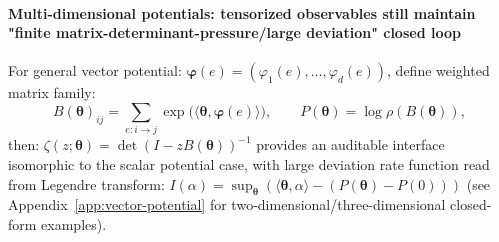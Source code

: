 \paragraph{Multi-dimensional potentials: tensorized observables still maintain "finite matrix-determinant-pressure/large deviation" closed loop}
For general vector potential:
\(
\boldsymbol{\varphi}(e)=(\varphi_1(e),\dots,\varphi_d(e))
\),
define weighted matrix family:
\[
B(\boldsymbol{\theta})_{ij}=\sum_{e:i\to j}\exp\!\bigl(\langle\boldsymbol{\theta},\boldsymbol{\varphi}(e)\rangle\bigr),
\qquad
P(\boldsymbol{\theta})=\log\rho(B(\boldsymbol{\theta})),
\]
then:
\(
\zeta(z;\boldsymbol{\theta})=\det(I-zB(\boldsymbol{\theta}))^{-1}
\)
provides an auditable interface isomorphic to the scalar potential case, with large deviation rate function read from Legendre transform:
\(
I(\alpha)=\sup_{\boldsymbol{\theta}}(\langle\boldsymbol{\theta},\alpha\rangle-(P(\boldsymbol{\theta})-P(0)))
\)
(see Appendix~\ref{app:vector-potential} for two-dimensional/three-dimensional closed-form examples).
